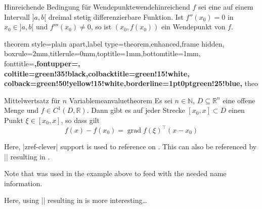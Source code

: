\begin{dispExample}
\begin{Theorem}[boxrule=2mm,toptitle=-1.5mm,bottomtitle=-1.5mm]{%
    Hinreichende Bedingung f\"{u}r Wendepunkte}{wendehinreichend}%
  $f$ sei eine auf einem Intervall $]a,b[$ dreimal stetig differenzierbare Funktion.
  Ist $f''(x_0)=0$ in $x_0\in]a,b[$ und $f'''(x_0)\ne 0$, so ist
  $(x_0,f(x_0))$ ein Wendepunkt von $f$.
\end{Theorem}
\end{dispExample}

\begin{dispExample}
%
  {theorem style=plain apart,label type=theorem,enhanced,frame hidden,
  boxrule=2mm,titlerule=0mm,toptitle=1mm,bottomtitle=1mm,
  fonttitle=\bfseries\large,fontupper=\normalsize,
  coltitle=green!35!black,colbacktitle=green!15!white,
  colback=green!50!yellow!15!white,borderline={1pt}{0pt}{green!25!blue},
  }{theo}

\begin{YetAnotherTheorem}{Mittelwertsatz f\"{u}r $n$ Variable}{meanvaluetheorem}%
  Es sei $n\in\mathbb{N}$, $D\subseteq\mathbb{R}^n$ eine offene Menge und
  $f\in C^{1}(D,\mathbb{R})$. Dann gibt es auf jeder Strecke
  $[x_0,x]\subset D$ einen Punkt $\xi\in[x_0,x]$, so dass gilt
  \begin{equation*}
  f(x)-f(x_0) = \operatorname{grad} f(\xi)^{\top}(x-x_0)
  \end{equation*}
\end{YetAnotherTheorem}

\medskip
Here, |zref-clever| support is used to reference 
on . This 
can also be referenced by |\zvref| resulting in .
\end{dispExample}

\begin{marker}
Note that  was used in the example above to feed
 \cite{barros:zref-clever} with the needed name information.
\end{marker}

\clearpage

\begin{dispExample}
Here, using |\zvref| resulting in 
is more interesting\ldots
\end{dispExample}


